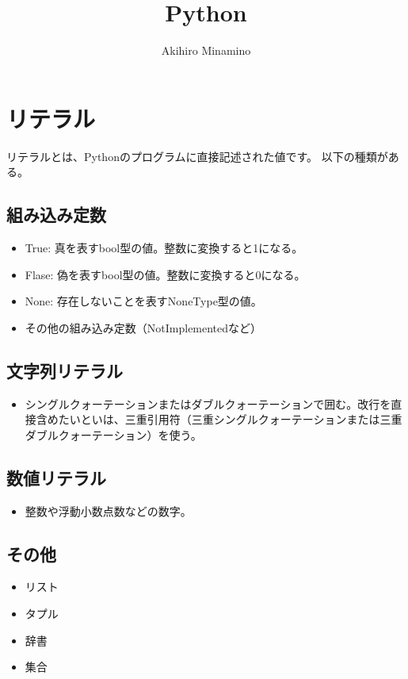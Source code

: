 \documentclass[11pt, oneside]{article}   	%
\title{Python}
\author{Akihiro Minamino}
\begin{document}
\maketitle
\section{リテラル}
リテラルとは、Pythonのプログラムに直接記述された値です。
以下の種類がある。

\subsection{組み込み定数}
\begin{itemize}
\item True: 真を表すbool型の値。整数に変換すると1になる。
\item Flase: 偽を表すbool型の値。整数に変換すると0になる。
\item None: 存在しないことを表すNoneType型の値。
\item その他の組み込み定数（NotImplementedなど）
\end{itemize}

\subsection{文字列リテラル}
\begin{itemize}
\item シングルクォーテーションまたはダブルクォーテーションで囲む。改行を直接含めたいといは、三重引用符（三重シングルクォーテーションまたは三重ダブルクォーテーション）を使う。
\end{itemize}

\subsection{数値リテラル}
\begin{itemize}
\item 整数や浮動小数点数などの数字。
\end{itemize}

\subsection{その他}
\begin{itemize}
\item リスト
\item タプル
\item 辞書
\item 集合
\end{itemize}
\end{document}
